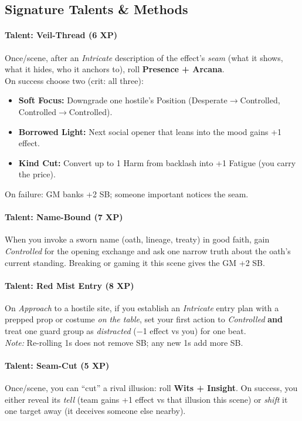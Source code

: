 \subsection{Signature Talents \& Methods}
\paragraph{Talent: Veil-Thread (6 XP)}
Once/scene, after an \emph{Intricate} description of the effect's \emph{seam} (what it shows, what it hides, who it anchors to), roll \textbf{Presence + Arcana}. \\
On success choose two (crit: all three):
\begin{itemize}
  \item \textbf{Soft Focus:} Downgrade one hostile's Position (Desperate$\to$Controlled, Controlled$\to$Controlled).
  \item \textbf{Borrowed Light:} Next social opener that leans into the mood gains +1 effect.
  \item \textbf{Kind Cut:} Convert up to 1 Harm from backlash into +1 Fatigue (you carry the price).
\end{itemize}
On failure: GM banks +2 SB; someone important notices the seam.

\paragraph{Talent: Name-Bound (7 XP)}
When you invoke a sworn name (oath, lineage, treaty) in good faith, gain \emph{Controlled} for the opening exchange and ask one narrow truth about the oath's current standing. Breaking or gaming it this scene gives the GM +2 SB.

\paragraph{Talent: Red Mist Entry (8 XP)}
On \emph{Approach} to a hostile site, if you establish an \emph{Intricate} entry plan with a prepped prop or costume \emph{on the table}, set your first action to \emph{Controlled} \textbf{and} treat one guard group as \emph{distracted} (−1 effect vs you) for one beat. \\
\emph{Note:} Re-rolling 1s does not remove SB; any new 1s add more SB.

\paragraph{Talent: Seam-Cut (5 XP)}
Once/scene, you can ``cut'' a rival illusion: roll \textbf{Wits + Insight}. On success, you either reveal its \emph{tell} (team gains +1 effect vs that illusion this scene) or \emph{shift} it one target away (it deceives someone else nearby).

